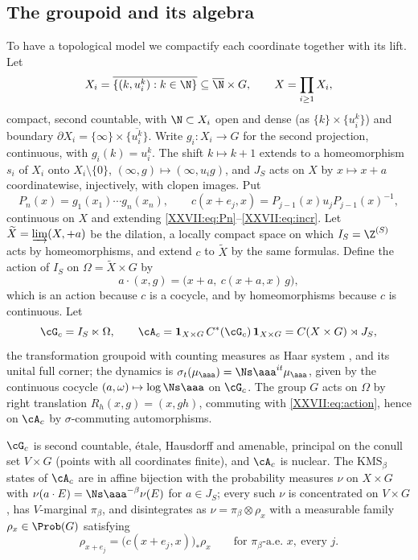\subsection{The groupoid and its algebra}

To have a topological model we compactify each coordinate together with its lift. Let
\[
X_i=\overline{\{(k,u_i^k):k\in\N\}}\subseteq\overline\N\times G,\qquad X=\prod_{i\ge1}X_i,
\]
compact, second countable, with $\N\subset X_i$ open and dense (as $\{k\}\times\{u_i^k\}$) and
boundary $\partial X_i=\{\infty\}\times\overline{\{u_i^k\}}$. Write $g_i:X_i\to G$ for the
second projection, continuous, with $g_i(k)=u_i^k$. The shift $k\mapsto k+1$ extends to a
homeomorphism $s_i$ of $X_i$ onto $X_i\setminus\{0\}$, $(\infty,g)\mapsto(\infty,u_ig)$, and
$J_S$ acts on $X$ by $x\mapsto x+a$ coordinatewise, injectively, with clopen images. Put
\[
P_n(x)=g_1(x_1)\cdots g_n(x_n),\qquad
c(x+e_j,x)=P_{j-1}(x)u_jP_{j-1}(x)^{-1},
\]
continuous on $X$ and extending \eqref{XXVII:eq:Pn}--\eqref{XXVII:eq:incr}. Let $\widetilde X=\varinjlim(X,+a)$
be the dilation, a locally compact space on which $I_S=\Z^{(S)}$ acts by homeomorphisms, and
extend $c$ to $\widetilde X$ by the same formulas. Define the action of $I_S$ on
$\Omega=\widetilde X\times G$ by
\begin{equation}\label{XXVII:eq:action}
a\cdot(x,g)=\bigl(x+a,\ c(x+a,x)\,g\bigr),
\end{equation}
which is an action because $c$ is a cocycle, and by homeomorphisms because $c$ is
continuous. Let
\[
\cG_c=I_S\ltimes\Omega,\qquad
\cA_c=\mathbf 1_{X\times G}\,C^*(\cG_c)\,\mathbf 1_{X\times G}=C(X\times G)\rtimes J_S,
\]
the transformation groupoid with counting measures as Haar system \cite{Renault}, and
its unital full corner; the dynamics is $\sigma_t(\mu_\aaa)=\Ns\aaa^{it}\mu_\aaa$, given by the continuous
cocycle $(a,\omega)\mapsto\log\Ns\aaa$ on $\cG_c$. The group $G$ acts on $\Omega$ by right
translation $R_h(x,g)=(x,gh)$, commuting with \eqref{XXVII:eq:action}, hence on $\cA_c$ by
$\sigma$-commuting automorphisms.

\begin{lemma}\label{XXVII:lem:basic}
$\cG_c$ is second countable, \'etale, Hausdorff and amenable, principal on the conull set
$V\times G$ (points with all coordinates finite), and $\cA_c$ is nuclear. The
$\mathrm{KMS}_\beta$ states of $\cA_c$ are in affine bijection with the probability
measures $\nu$ on $X\times G$ with $\nu(a\cdot E)=\Ns\aaa^{-\beta}\nu(E)$ for $a\in J_S$; every
such $\nu$ is concentrated on $V\times G$, has $V$-marginal $\pi_\beta$, and disintegrates as
$\nu=\pi_\beta\otimes\rho_x$ with a measurable family $\rho_x\in\Prob(G)$ satisfying
\begin{equation}\label{XXVII:eq:equiv}
\rho_{x+e_j}=\bigl(c(x+e_j,x)\bigr)_*\rho_x\qquad\text{for }\pi_\beta\text{-a.e.\ }x,\ \text{every }j .
\end{equation}
\end{lemma}

